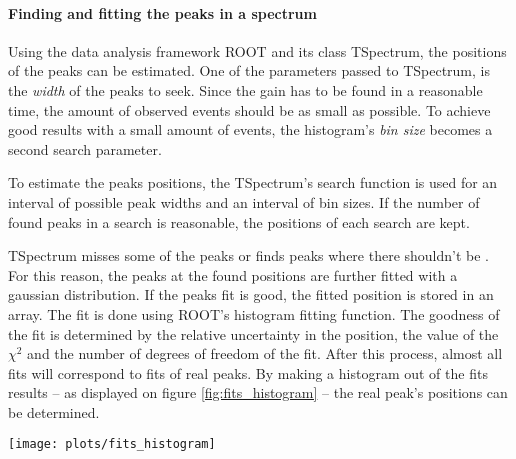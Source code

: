 \paragraph{Finding and fitting the peaks in a spectrum} Using the data analysis framework ROOT and its class TSpectrum, the positions of the peaks can be estimated.
One of the parameters passed to TSpectrum, is the \emph{width} of the peaks to seek.
Since the gain has to be found in a reasonable time, the amount of observed events should be as small as possible.
To achieve good results with a small amount of events, the histogram's \emph{bin size} becomes a second search parameter.
\begin{figure*}
  \caption{%
    TODO: generate a plot displaying the same histogram with different bin sizes.
  }
  \label{fig:bin_size}
\end{figure*}
To estimate the peaks positions, the TSpectrum's search function is used for an interval of possible peak widths and an interval of bin sizes.
If the number of found peaks in a search is reasonable, the positions of each search are kept.

TSpectrum misses some of the peaks or finds peaks where there shouldn't be .
For this reason, the peaks at the found positions are further fitted with a gaussian distribution.
If the peaks fit is good, the fitted position is stored in an array.
The fit is done using ROOT's histogram fitting function.
The goodness of the fit is determined by the relative uncertainty in the position, the value of the $\chi^2$ and the number of degrees of freedom of the fit.
After this process, almost all fits will correspond to fits of real peaks.
By making a histogram out of the fits results -- as displayed on figure \ref{fig:fits_histogram} -- the real peak's positions can be determined.
\begin{figure*}
  \texttt{[image: plots/fits\_histogram]}
  \caption{%
    Distribution of the fits positions.
    TODO: go into more detail here
  }
  \label{fig:fits_histogram}
\end{figure*}



